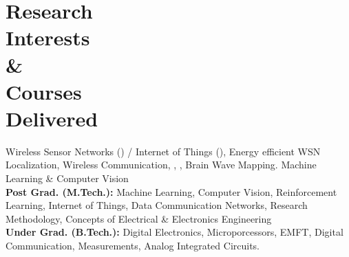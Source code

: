\vspace{-2.5em}
{\section{Research\\Interests\\\&\\Courses\\Delivered}
Wireless Sensor Networks () / Internet of Things (), Energy efficient WSN Localization, Wireless Communication, , , Brain Wave Mapping. Machine Learning  \& Computer Vision\\ 
\textbf{Post Grad. (M.Tech.):} Machine Learning, Computer Vision, Reinforcement Learning, Internet of Things, Data Communication Networks, Research Methodology, Concepts of Electrical \& Electronics Engineering\\
\textbf{Under Grad. (B.Tech.):} Digital Electronics, Microporcessors, EMFT, Digital Communication, Measurements, Analog Integrated Circuits.
\sectionline
}
